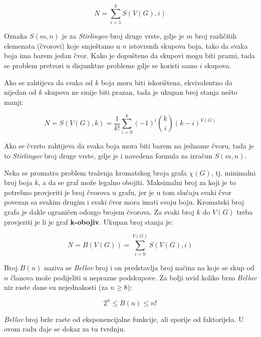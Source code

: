 \documentclass[times, utf8, diplomski, numeric]{fer}
\begin{document}
\begin{equation}
N = \sum_{i=1}^{k} S(V(G), i)
\end{equation}

Oznaka $S(m,n)$ je za \emph{Stirlingov} broj druge vrste, gdje je $m$ broj različitih elemenata (čvorovi) koje smještamo u $n$ istovrsnih skupova boja, tako da svaka boja ima barem jedan čvor. Kako je dopušteno da skupovi mogu biti prazni, tada se problem pretvori u disjunktne probleme gdje se koristi samo $i$ skupova. 

Ako se zahtijeva da svaka od $k$ boja mora biti iskorištena, ekvivalentno da nijedan od $k$ skupova ne smije biti prazan, tada je ukupan broj stanja nešto manji:

\begin{equation}
N = S(V(G), k) = \frac{1}{k!}\sum_{i=0}^{k} (-1)^i \binom{k}{i}(k-i)^{V(G)}  
\end{equation}

Ako se čvrsto zahtijeva da svaka boja mora biti barem na jednome čvoru, tada je to \emph{Stirlingov} broj druge vrste, gdje je i navedena formula za izračun $S(m,n)$.

Neka se promatra problem traženja kromatskog broja grafa $\chi(G)$, tj. minimalni broj boja $k$, a da se graf može legalno obojiti. Maksimalni broj za koji je to potrebno provjeriti je broj čvorova u grafu, jer je u tom slučaju svaki čvor povezan sa svakim drugim i svaki čvor mora imati svoju boju. Kromatski broj grafa je dakle ograničen odozgo brojem čvorova. Za svaki broj $k$ do $V(G)$ treba provjeriti je li je graf \textbf{k-obojiv}. Ukupan broj stanja je:

\begin{equation}
N = B(V(G)) = \sum_{i=0}^{V(G)} S(V(G), i)
\end{equation}

Broj $B(n)$ naziva se \emph{Bellov} broj i on predstavlja broj načina na koje se skup od $n$ članova može podijeliti u neprazne podskupove. Za bolji uvid koliko brzo \emph{Bellov} niz raste dane su nejednakosti (za $n\ge 8$): 

\begin{equation}
2^n \le B(n) \le n! 
\end{equation}

\emph{Bellov} broj brže raste od eksponencijalne funkcije, ali sporije od faktorijela. U ovom radu daje se dokaz za tu tvrdnju.
\end{document}
